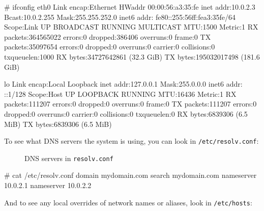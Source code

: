 \documentclass[10pt,american,]{book}
\newenvironment{Shaded}{\begin{snugshade}}{\end{snugshade}}
\newcommand{\KeywordTok}[1]{\textcolor[rgb]{0.13,0.29,0.53}{\textbf{{#1}}}}
\newcommand{\CommentTok}[1]{\textcolor[rgb]{0.56,0.35,0.01}{\textit{{#1}}}}
\newcommand{\NormalTok}[1]{{#1}}
\numberwithin{figure}{chapter}
\DeclareRobustCommand{\drcap}[1]{\begin{figure}[H]\caption{#1}\end{figure}}
\renewcommand{\KeywordTok}[1]{{#1}}
\renewcommand{\CommentTok}[1]{{#1}}
\renewcommand{\NormalTok}[1]{{#1}}
\begin{document}
\begin{Shaded}
\begin{Highlighting}[]
\CommentTok{# ifconfig}
\KeywordTok{eth0}      \NormalTok{Link encap:Ethernet  HWaddr 00:00:56:a3:35:fe}
          \KeywordTok{inet} \NormalTok{addr:10.0.2.3  Bcast:10.0.2.255  Mask:255.255.252.0}
          \KeywordTok{inet6} \NormalTok{addr: fe80::255:56ff:fea3:35fe/64 Scope:Link}
          \KeywordTok{UP} \NormalTok{BROADCAST RUNNING MULTICAST  MTU:1500  Metric:1}
          \KeywordTok{RX} \NormalTok{packets:364565022 errors:0 dropped:386406 overruns:0 frame:0}
          \KeywordTok{TX} \NormalTok{packets:35097654 errors:0 dropped:0 overruns:0 carrier:0}
          \KeywordTok{collisions}\NormalTok{:0 txqueuelen:1000}
          \KeywordTok{RX} \NormalTok{bytes:34727642861 (32.3 GiB)  }\KeywordTok{TX} \NormalTok{bytes:195032017498 (181.6 GiB)}

\KeywordTok{lo}        \NormalTok{Link encap:Local Loopback}
          \KeywordTok{inet} \NormalTok{addr:127.0.0.1  Mask:255.0.0.0}
          \KeywordTok{inet6} \NormalTok{addr: ::1/128 Scope:Host}
          \KeywordTok{UP} \NormalTok{LOOPBACK RUNNING  MTU:16436  Metric:1}
          \KeywordTok{RX} \NormalTok{packets:111207 errors:0 dropped:0 overruns:0 frame:0}
          \KeywordTok{TX} \NormalTok{packets:111207 errors:0 dropped:0 overruns:0 carrier:0}
          \KeywordTok{collisions}\NormalTok{:0 txqueuelen:0}
          \KeywordTok{RX} \NormalTok{bytes:6839306 (6.5 MiB)  }\KeywordTok{TX} \NormalTok{bytes:6839306 (6.5 MiB)}
\end{Highlighting}
\end{Shaded}

To see what DNS servers the system is using, you can look in
\texttt{/etc/resolv.conf}:

\drcap{DNS servers in \texttt{resolv.conf}}

\begin{Shaded}
\begin{Highlighting}[]
\CommentTok{# cat /etc/resolv.conf}
\KeywordTok{domain} \NormalTok{mydomain.com}
\KeywordTok{search} \NormalTok{mydomain.com}
\KeywordTok{nameserver} \NormalTok{10.0.2.1}
\KeywordTok{nameserver} \NormalTok{10.0.2.2}
\end{Highlighting}
\end{Shaded}

And to see any local overrides of network names or aliases, look in
\texttt{/etc/hosts}:
\end{document}

